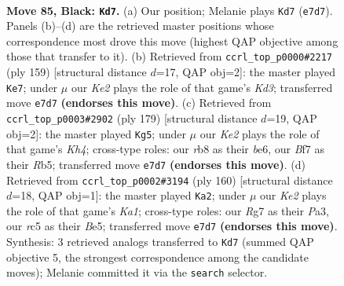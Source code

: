 \documentclass[11pt]{article}
\begin{document}
\clearpage

\begin{figure}[p]\centering
\begin{subfigure}{0.46\textwidth}\centering
\resizebox{\linewidth}{!}{%
\newchessgame
\chessboard[
  setfen={1R6/4kbr1/8/2R5/1P2K3/8/8/8 b - - 44 85},
  showmover=false,
  pgfstyle=straightmove, color=movearrow, markmove={e7-d7}
]}
\caption{}
\end{subfigure}\hfill
\begin{subfigure}{0.46\textwidth}\centering
\resizebox{\linewidth}{!}{%
\newchessgame
\chessboard[
  setfen={8/8/2rkb3/7R/8/3K4/8/R7 b - - 18 80},
  showmover=false,
  pgfstyle=straightmove, color=movearrow, markmove={d6-e7}
]}
\caption{}
\end{subfigure}
\\[4pt]
\begin{subfigure}{0.46\textwidth}\centering
\resizebox{\linewidth}{!}{%
\newchessgame
\chessboard[
  setfen={8/8/2R1B3/1r5k/1b2K3/1P6/8/8 b - - 88 90},
  showmover=false,
  pgfstyle=straightmove, color=movearrow, markmove={h5-g5}
]}
\caption{}
\end{subfigure}\hfill
\begin{subfigure}{0.46\textwidth}\centering
\resizebox{\linewidth}{!}{%
\newchessgame
\chessboard[
  setfen={8/3r4/4R3/4Bp2/2k5/P7/8/K7 w - - 1 81},
  showmover=false,
  pgfstyle=straightmove, color=movearrow, markmove={a1-a2}
]}
\caption{}
\end{subfigure}
\caption{\textbf{Move 85, Black: \texttt{Kd7}.} (a) Our position; Melanie plays \texttt{Kd7} (\texttt{e7d7}). Panels (b)--(d) are the retrieved master positions whose correspondence most drove this move (highest QAP objective among those that transfer to it). (b) Retrieved from \texttt{ccrl\_top\_p0000\#2217} (ply 159) [structural distance $d$=17, QAP obj=2]: the master played \texttt{Ke7}; under $\mu$ our \emph{Ke2} plays the role of that game's \emph{Kd3}; transferred move \texttt{e7d7} \textbf{(endorses this move)}. (c) Retrieved from \texttt{ccrl\_top\_p0003\#2902} (ply 179) [structural distance $d$=19, QAP obj=2]: the master played \texttt{Kg5}; under $\mu$ our \emph{Ke2} plays the role of that game's \emph{Kh4}; cross-type roles: our \emph{r}b8 as their \emph{b}e6, our \emph{B}f7 as their \emph{R}b5; transferred move \texttt{e7d7} \textbf{(endorses this move)}. (d) Retrieved from \texttt{ccrl\_top\_p0002\#3194} (ply 160) [structural distance $d$=18, QAP obj=1]: the master played \texttt{Ka2}; under $\mu$ our \emph{Ke2} plays the role of that game's \emph{Ka1}; cross-type roles: our \emph{R}g7 as their \emph{P}a3, our \emph{r}c5 as their \emph{B}e5; transferred move \texttt{e7d7} \textbf{(endorses this move)}. Synthesis: 3 retrieved analogs transferred to \texttt{Kd7} (summed QAP objective 5, the strongest correspondence among the candidate moves); Melanie committed it via the \texttt{search} selector.}
\label{fig:thought-m169}
\end{figure}
\end{document}
